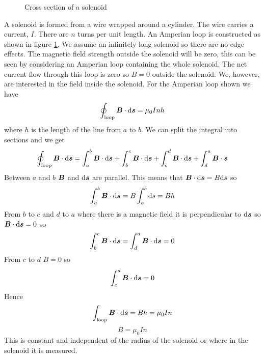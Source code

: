 \documentclass{article}
\begin{document}
    \begin{figure}[ht]
        \centering
        \caption{Cross section of a solenoid}
        \label{fig:solenoid}
    \end{figure}
    A solenoid is formed from a wire wrapped around a cylinder.
    The wire carries a current, \(I\).
    There are \(n\) turns per unit length.
    An Amperian loop is constructed as shown in figure \ref{fig:solenoid}.
    We assume an infinitely long solenoid so there are no edge effects.
    The magnetic field strength outside the solenoid will be zero, this can be seen by considering an Amperian loop containing the whole solenoid.
    The net current flow through this loop is zero so \(B = 0\) outside the solenoid.
    We, however, are interested in the field inside the solenoid.
    For the Amperian loop shown we have
    \[\oint_\text{loop}\bm{B}\cdot\dd\bm{s} = \mu_0Inh\]
    where \(h\) is the length of the line from \(a\) to \(b\).
    We can split the integral into sections and we get
    \[\oint_\text{loop}\bm{B}\cdot\dd\bm{s} = \int_a^b\bm{B}\cdot\dd\bm{s} + \int_b^c\bm{B}\cdot\dd\bm{s} + \int_c^d\bm{B}\cdot\dd\bm{s} + \int_d^a\bm{B}\cdot\bm{s}\]
    Between \(a\) and \(b\) \(\bm{B}\) and \(\dd\bm{s}\) are parallel.
    This means that \(\bm{B}\cdot\dd\bm{s} = B\dd s\) so
    \[\int_a^b\bm{B}\cdot\dd\bm{s} = B\int_a^b\dd s = Bh\]
    From \(b\) to \(c\) and \(d\) to \(a\) where there is a magnetic field it is perpendicular to \(\dd\bm{s}\) so \(\bm{B}\cdot\dd\bm{s} = 0\) so
    \[\int_b^c\bm{B}\cdot\dd\bm{s} = \int_d^a\bm{B}\cdot\dd\bm{s} = 0\]
    From \(c\) to \(d\) \(B = 0\) so
    \[\int_c^d\bm{B}\cdot\dd\bm{s} = 0\]
    Hence
    \[\int_\text{loop}\bm{B}\cdot\dd\bm{s} = Bh = \mu_0In\]
    \[B = \mu_0 In\]
    This is constant and independent of the radius of the solenoid or where in the solenoid it is measured.
    
\end{document}
